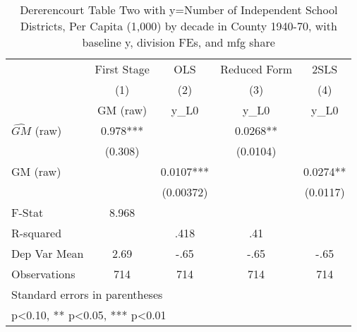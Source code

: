 \begin{table}[htbp]\centering
\def\sym#1{\ifmmode^{#1}\else\(^{#1}\)\fi}
\caption{Dererencourt Table Two with y=Number of Independent School Districts, Per Capita (1,000) by decade in County 1940-70, with baseline y, division FEs, and mfg share}
\begin{tabular}{l*{4}{c}}
\toprule
                    & First Stage   &         OLS   &Reduced Form   &        2SLS   \\
                    &\multicolumn{1}{c}{(1)}&\multicolumn{1}{c}{(2)}&\multicolumn{1}{c}{(3)}&\multicolumn{1}{c}{(4)}\\
                    &\multicolumn{1}{c}{GM  (raw)}&\multicolumn{1}{c}{y\_L0}&\multicolumn{1}{c}{y\_L0}&\multicolumn{1}{c}{y\_L0}\\
\midrule
$\hat{GM}$ (raw)    &       0.978***&               &      0.0268** &               \\
                    &     (0.308)   &               &    (0.0104)   &               \\
\addlinespace
GM  (raw)           &               &      0.0107***&               &      0.0274** \\
                    &               &   (0.00372)   &               &    (0.0117)   \\
\midrule
F-Stat              &       8.968   &               &               &               \\
R-squared           &               &        .418   &         .41   &               \\
Dep Var Mean        &        2.69   &        -.65   &        -.65   &        -.65   \\
Observations        &         714   &         714   &         714   &         714   \\
\bottomrule
\multicolumn{5}{l}{\footnotesize Standard errors in parentheses}\\
\multicolumn{5}{l}{\footnotesize * p<0.10, ** p<0.05, *** p<0.01}\\
\end{tabular}
\end{table}
